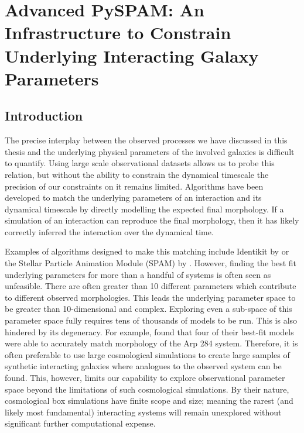 \chapter{Advanced PySPAM: An Infrastructure to Constrain Underlying Interacting Galaxy Parameters}\label{chapter4}
\section{Introduction}\label{Introduction}
\noindent The precise interplay between the observed processes we have discussed in this thesis and the underlying physical parameters of the involved galaxies is difficult to quantify. Using large scale observational datasets allows us to probe this relation, but without the ability to constrain the dynamical timescale the precision of our constraints on it remains limited. Algorithms have been developed to match the underlying parameters of an interaction and its dynamical timescale by directly modelling the expected final morphology. If a simulation of an interaction can reproduce the final morphology, then it has likely correctly inferred the interaction over the dynamical time.

Examples of algorithms designed to make this matching include Identikit by \citet{2009AJ....137.3071B} or the Stellar Particle Animation Module (SPAM) by \citet{1990AJ....100.1477W}. However, finding the best fit underlying parameters for more than a handful of systems is often seen as unfeasible. There are often greater than 10 different parameters which contribute to different observed morphologies. This leads the underlying parameter space to be greater than 10-dimensional and complex. Exploring even a sub-space of this parameter space fully requires tens of thousands of models to be run. This is also hindered by its degeneracy. For example, \citet{2010ASPC..423..227S} found that four of their best-fit models were able to accurately match morphology of the Arp 284 system. Therefore, it is often preferable to use large cosmological simulations \citep[e.g.][]{2015MNRAS.446..521S, 2018MNRAS.480..800H, 2020MNRAS.493.3716H} to create large samples of synthetic interacting galaxies where analogues to the observed system can be found. This, however, limits our capability to explore observational parameter space beyond the limitations of such cosmological simulations. By their nature, cosmological box simulations have finite scope and size; meaning the rarest (and likely most fundamental) interacting systems will remain unexplored without significant further computational expense.

